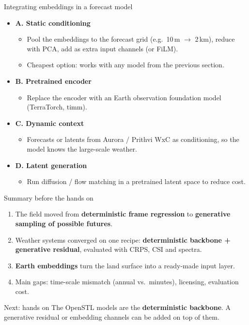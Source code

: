\documentclass{beamer}
\begin{document}
\begin{frame}{Integrating embeddings in a forecast model}
    \small
    \begin{itemize}
        \item \textbf{A. Static conditioning}
        \begin{itemize}
            \item Pool the embeddings to the forecast grid (e.g.\ 10\,m $\rightarrow$ 2\,km), reduce with PCA, add as extra input channels (or FiLM).
            \item Cheapest option: works with any model from the previous section.
        \end{itemize}
        \item \textbf{B. Pretrained encoder}
        \begin{itemize}
            \item Replace the encoder with an Earth observation foundation model (TerraTorch, timm).
        \end{itemize}
        \item \textbf{C. Dynamic context}
        \begin{itemize}
            \item Forecasts or latents from Aurora / Prithvi WxC as conditioning, so the model knows the large-scale weather.
        \end{itemize}
        \item \textbf{D. Latent generation}
        \begin{itemize}
            \item Run diffusion / flow matching in a pretrained latent space to reduce cost.
        \end{itemize}
    \end{itemize}
\end{frame}


\begin{frame}{Summary before the hands on}
    \begin{enumerate}
        \item The field moved from \textbf{deterministic frame regression} to \textbf{generative sampling of possible futures}.
        \item Weather systems converged on one recipe: \textbf{deterministic backbone + generative residual}, evaluated with CRPS, CSI and spectra.
        \item \textbf{Earth embeddings} turn the land surface into a ready-made input layer.
        \item Main gaps: time-scale mismatch (annual vs.\ minutes), licensing, evaluation cost.
    \end{enumerate}

    \espaco
    \begin{block}{Next: hands on}
        \footnotesize The OpenSTL models are the \textbf{deterministic backbone}. A generative residual or embedding channels can be added on top of them.
    \end{block}
\end{frame}
\end{document}
